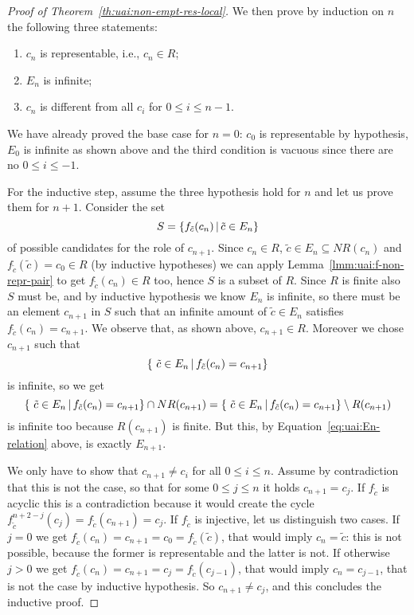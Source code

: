 \begin{proof}[Proof of Theorem~\ref{th:uai:non-empt-res-local}]
	We then prove by induction on $n$ the following three statements:
	\begin{enumerate}
		\item $c_n$ is representable, i.e., $c_n \in R$;
		\item $E_n$ is infinite;
		\item $c_n$ is different from all $c_i$ for $0 \le i \le n - 1$.
	\end{enumerate}
	We have already proved the base case for $n = 0$: $c_0$ is representable by hypothesis, $E_0$ is infinite as shown above and the third condition is vacuous since there are no $0 \le i \le -1$.

	For the inductive step, assume the three hypothesis hold for $n$ and let us prove them for $n + 1$.
	Consider the set
	\begin{equation*}
		S = \{ f_{\tilde{c}}(c_n) \,\vert\, \tilde{c} \in E_n \}
	\end{equation*}
	of possible candidates for the role of $c_{n+1}$.
	Since $c_n \in R$, $\tilde{c} \in E_n \subseteq NR(c_n)$ and $f_{\tilde{c}}(\tilde{c}) = c_0 \in R$ (by inductive hypotheses) we can apply Lemma~\ref{lmm:uai:f-non-repr-pair} to get $f_{\tilde{c}}(c_n) \in R$ too, hence $S$ is a subset of $R$.
	Since $R$ is finite also $S$ must be, and by inductive hypothesis we know $E_n$ is infinite, so there must be an element $c_{n+1}$ in $S$ such that an infinite amount of $\tilde{c} \in E_n$ satisfies $f_{\tilde{c}}(c_n) = c_{n+1}$. We observe that, as shown above, $c_{n+1} \in R$. Moreover we chose $c_{n+1}$ such that
	\begin{equation*}
		\{\ \tilde{c} \in E_n \,\vert\, f_{\tilde{c}}(c_n) = c_{n+1} \}
	\end{equation*}
	is infinite, so we get
	\begin{equation*}
		\{\ \tilde{c} \in E_n \,\vert\, f_{\tilde{c}}(c_n) = c_{n+1} \} \cap NR(c_{n+1}) = \{\ \tilde{c} \in E_n \,\vert\, f_{\tilde{c}}(c_n) = c_{n+1} \} \setminus R(c_{n+1})
	\end{equation*}
	is infinite too because $R(c_{n+1})$ is finite. But this, by Equation~\eqref{eq:uai:En-relation} above, is exactly $E_{n+1}$.

	We only have to show that $c_{n+1} \neq c_i$ for all $0 \le i \le n$. Assume by contradiction that this is not the case, so that for some $0 \le j \le n$ it holds $c_{n+1} = c_j$. If $f_{\tilde{c}}$ is acyclic this is a contradiction because it would create the cycle $f_{\tilde{c}}^{n+2-j}(c_j) = f_{\tilde{c}}(c_{n+1}) = c_j$. If $f_{\tilde{c}}$ is injective, let us distinguish two cases. If $j = 0$ we get $f_{\tilde{c}}(c_n) = c_{n+1} = c_0 = f_{\tilde{c}}(\tilde{c})$, that would imply $c_n = \tilde{c}$: this is not possible, because the former is representable and the latter is not. If otherwise $j > 0$ we get $f_{\tilde{c}}(c_n) = c_{n+1} = c_j = f_{\tilde{c}}(c_{j-1})$, that would imply $c_n = c_{j-1}$, that is not the case by inductive hypothesis. So $c_{n+1} \neq c_j$, and this concludes the inductive proof.


\end{proof}
